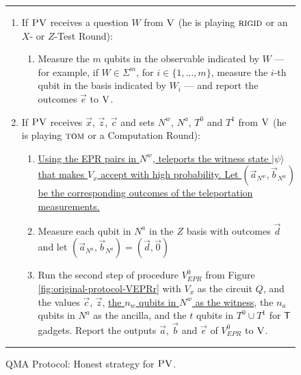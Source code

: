 \documentclass[11pt]{article}
\theoremstyle{remark}
\theoremstyle{definition}
\newcommand{\ket}[1]{|#1\rangle}
\newcommand{\rigid}{\textsc{rigid}}
\newcommand{\tom}{\textsc{tom}}
\newcommand{\ver}{\textsc{V}}
\newcommand{\pv}{\textsc{PV}}
\newcommand{\highlight}[1]{\uline{#1}}
\begin{document}
\begin{figure}[H]
\rule[1ex]{16.5cm}{0.5pt}
\vspace{-20pt}
\begin{enumerate}
  \item If $\pv$ receives a question ${W}$ from $\ver$ (he is playing $\rigid$ or an $X$- or $Z$-Test Round):
\begin{enumerate}
     \item[]  Measure the $m$ qubits in the observable indicated by $W$ --- for example, if $W\in \Sigma^m$, for $i\in \{1,\ldots,m\}$, measure the $i$-th qubit in the basis indicated by $W_i$ --- and report the outcomes $\vec{e}$ to $\ver$.
\end{enumerate}

  \item If $\pv$ receives $\vec{x}$, $\vec{z}$, $\vec{c}$ and sets $N^w$, $N^a$, $T^0$ and $T^1$ from $\ver$ (he is playing $\tom$ or a Computation Round):
\begin{enumerate}
  \item[] \highlight{Using the EPR pairs in $N^w$, teleports the witness state
    $\ket{\psi}$ that makes $V_x$ accept with high probability. Let $(\vec{a}_{N^w}, \vec{b}_{N^w})$ be the corresponding
    outcomes of the teleportation measurements.}
  \item[] Measure each qubit in $N^a$ in the $Z$ basis with outcomes $\vec{d}$  and let $(\vec{a}_{N^a},
    \vec{b}_{N^a}) = (\vec{d}, \vec{0} )$ 
	\item[] Run the second step of procedure $V_{EPR}^0$ from Figure
    \ref{fig:original-protocol-VEPRr} with $V_x$ as the circuit $Q$, and the
    values $\vec{c}$, $\vec{z}$, \highlight{the $n_w$ qubits in $N^w$ as the witness}, the $n_a$ qubits in 
        $N^a$ as the ancilla, and the $t$ qubits in $T^0\cup T^1$ for $\sf T$ gadgets. Report the outputs  $\vec{a}$, $\vec{b}$ and $\vec{e}$ of $V_{EPR}^0$ to $\ver$.
\end{enumerate}
\end{enumerate}
\rule[2ex]{16.5cm}{0.5pt}\vspace{-.5cm}
\caption{QMA Protocol: Honest strategy for $\pv$.}\label{fig:qma-protocol-PV}
\end{figure}
\end{document}
